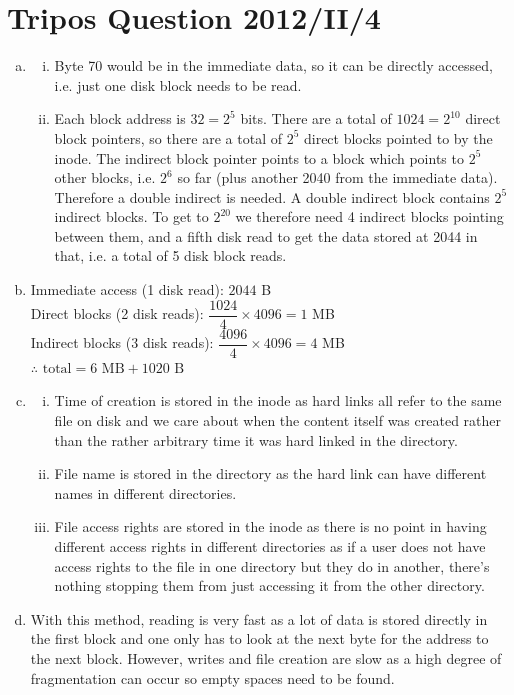 \documentclass[12pt]{article}
\begin{document}
\section{Tripos Question 2012/II/4}
\begin{enumerate}[(a)]
    \item \begin{enumerate}[(i)]
        \item Byte 70 would be in the immediate data, so it can be directly accessed, i.e. just one disk block needs to be read.
        \item Each block address is $32=2^5$ bits. There are a total of $1024=2^{10}$ direct block pointers, so there are a total of $2^5$ direct blocks pointed to by the inode. The indirect block pointer points to a block which points to $2^5$ other blocks, i.e. $2^6$ so far (plus another 2040 from the immediate data). Therefore a double indirect is needed. A double indirect block contains $2^5$ indirect blocks. To get to $2^{20}$ we therefore need 4 indirect blocks pointing between them, and a fifth disk read to get the data stored at 2044 in that, i.e. a total of 5 disk block reads.
    \end{enumerate}
    \item Immediate access (1 disk read): $2044$ B\\
    Direct blocks (2 disk reads): $\dfrac{1024}{4} \times 4096 = 1$ MB\\
    Indirect blocks (3 disk reads): $\dfrac{4096}{4} \times 4096 = 4$ MB\\
    $\therefore$ $\text{total} = 6 \text{ MB} + 1020 \text{ B}$
    \item \begin{enumerate}[(i)]
        \item Time of creation is stored in the inode as hard links all refer to the same file on disk and we care about when the content itself was created rather than the rather arbitrary time it was hard linked in the directory.
        \item File name is stored in the directory as the hard link can have different names in different directories.
        \item File access rights are stored in the inode as there is no point in having different access rights in different directories as if a user does not have access rights to the file in one directory but they do in another, there's nothing stopping them from just accessing it from the other directory.
    \end{enumerate}
    \item With this method, reading is very fast as a lot of data is stored directly in the first block and one only has to look at the next byte for the address to the next block. However, writes and file creation are slow as a high degree of fragmentation can occur so empty spaces need to be found.
\end{enumerate}
\end{document}
